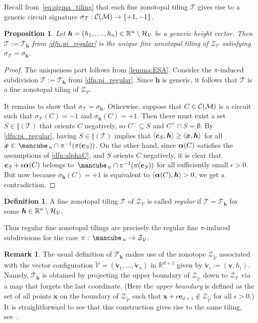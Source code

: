 \documentclass[11pt]{amsart}
\theoremstyle{plain}
\newtheorem{proposition}[theorem]{Proposition}
\theoremstyle{definition}
\newtheorem{definition}[theorem]{Definition}
\newtheorem{remark}[theorem]{Remark}
\def\R{\mathbb{R}}
\def\v{{\bm{v}}}
\def\x{{\bm{x}}}
\def\V{\mathcal{V}}
\def\h{{\bm{h}}}
\def\e{{\bm{e}}}
\def\Zon{\mathcal{Z}}
\def\ZV{\Zon_\V}
\def\cube{\mbox{\,\mancube\,}}
\def\Tcal{\mathcal{T}}
\def\Tiling{\Tcal}
\let\subset\subseteq
\begin{document}
Recall from~\eqref{eq:sigma_tiling} that each fine zonotopal tiling $\Tiling$ gives rise to a generic circuit signature ${\sigma_\Tiling:\Circuits\to\{+1,-1\}}$.

\begin{proposition}\label{prop:circuit}
Let $\h=(h_1,\dots,h_n)\in \GHV$ be a generic height vector. Then $\Tiling:=\Tiling_\h$ from \cref{dfn:pi_regular} is the unique fine zonotopal tiling of $\ZV$ satisfying $\sigma_\Tiling=\sigma_\h$.
\end{proposition}
\begin{proof}
The uniqueness part follows from \cref{lemma:ESA}. Consider the $\pi$-induced subdivision $\Tiling:=\Tiling_\h$ from \cref{dfn:pi_regular}. Since $\h$ is generic, it follows that $\Tiling$ is a fine zonotopal tiling of $\ZV$.

It remains to show that $\sigma_\Tiling=\sigma_\h$. Otherwise, suppose that $C\in\mathcal{C}(\mathcal{M})$ is a circuit such that $\sigma_\Tiling(C)=-1$ and $\sigma_\h(C)=+1$. Then there must exist a set $S\in\Vert(\Tiling)$ that orients $C$ negatively, so $C^-\subset S$ and $C^+\cap S=\emptyset$. By \cref{dfn:pi_regular}, having $S\in\Vert(\Tiling)$ implies that $\<\e_S,\h\>\geq \<\x,\h\>$ for all $\x\in\cube_n\cap \pi^{-1}(\pi(\e_S))$. On the other hand, since 
 $\bm{\alpha}(C)$ satisfies the assumptions of \cref{dfn:alphaC}, and $S$ orients $C$ negatively,
	it is clear that $\e_S+\epsilon \alphaC$ belongs to $\cube_n\cap \pi^{-1}(\pi(\e_S))$ for all sufficiently small $\epsilon>0$.  But now because $\sigma_\h(C)=+1$ is equivalent to $\<\alphaC,\h\>>0$, we get a contradiction. 
\end{proof}

\begin{definition}\label{dfn:regular_tiling}
A fine zonotopal tiling $\Tiling$ of $\ZV$ is called \emph{regular} if $\Tiling=\Tiling_\h$ for some $\h\in\GHV$.
\end{definition}
\noindent Thus regular fine zonotopal tilings are precisely the regular fine $\pi$-induced subdivisions for the case $\pi:\cube_n\to \ZV$. 

\def\Vt{{\widetilde{\V}}}
\def\ZVt{\Zon_{\Vt}}
\def\vt{\widetilde\v}
\begin{remark}\label{rmk:upper}
  The usual definition of $\Tiling_\h$ makes use of the zonotope $\ZVt$ associated with the vector configuration $\Vt=(\vt_1,\dots,\vt_n)$ in $\R^{d+1}$ given by $\vt_i:=(\v,h_i)$. Namely, $\Tiling_\h$ is obtained by projecting the upper boundary of $\ZVt$ down to $\ZV$ via a map that forgets the last coordinate. (Here the \emph{upper boundary} is defined as the set of all points $\x$ on the boundary of $\ZVt$ such that $\x+\epsilon \e_{d+1}\notin \ZVt$ for all $\epsilon>0$.)  It is straightforward to see that this construction gives rise to the same tiling, see~\cite[Lemma~4.2]{BS}.
\end{remark}
\end{document}
